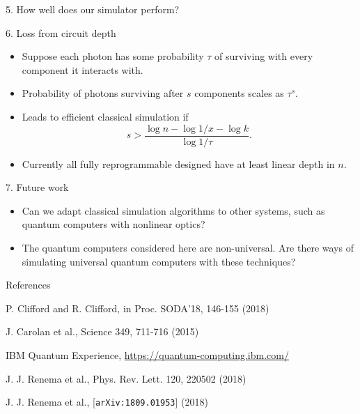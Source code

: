 \documentclass[]{templates/poster}
\begin{document}
\begin{frame}{}
\begin{columns}[t]
\begin{column}{0.422\linewidth}
\begin{block}{\Large 5. How well does our simulator perform?}
  \end{block}
  
  \begin{block}{\Large 6. Loss from circuit depth}
  \begin{itemize}
  \item Suppose each photon has some probability $\tau$ of surviving with every component it interacts with.
  \item Probability of photons surviving after $s$ components scales as $\tau^s$.
  \item Leads to efficient classical simulation if
  \begin{equation}
  s>\frac{\log n-\log 1/x-\log k}{\log1/\tau}.
  \end{equation}
  \item Currently all fully reprogrammable designed have at least linear depth in $n$.
  \end{itemize}
  \end{block}
  
  \begin{block}{\Large 7. Future work}
  \begin{itemize}
  \item Can we adapt classical simulation algorithms to other systems, such as quantum computers with nonlinear optics?
  \item The quantum computers considered here are non-universal. Are there ways of simulating universal quantum computers with these techniques?
  \end{itemize}
  \end{block}

  \begin{block}{\Large References}
  
  \noindent [CC+18] P. Clifford and R. Clifford, in Proc. SODA'18, 146-155 (2018)
  
  \noindent [CHS+15] J. Carolan et al., Science 349, 711-716 (2015)
  
  \noindent [IBM] IBM Quantum Experience, \url{https://quantum-computing.ibm.com/}
  
  \noindent [RMC+18] J. J. Renema et al., Phys. Rev. Lett. 120, 220502 (2018)
  
  \noindent [RSG-P18] J. J. Renema et al., [\texttt{arXiv:1809.01953}] (2018)
  \end{block}
  \end{column}
\end{columns}

\end{frame}

\end{document}
